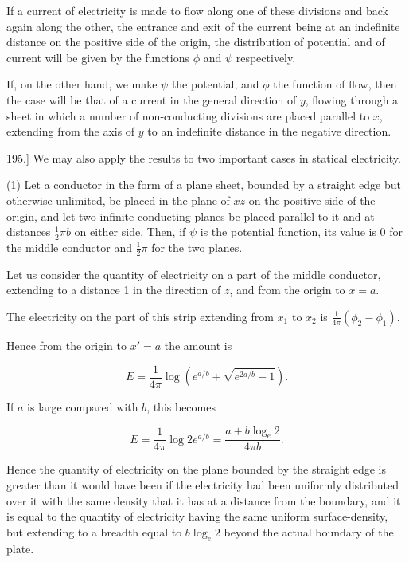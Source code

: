 \documentclass[11pt,a4paper]{article}
\begin{document}
If a current of electricity is made to flow along one of these divisions
and back again along the other, the entrance and exit of the current
being at an indefinite distance on the positive side of the origin, the
distribution of potential and of current will be given by the functions
$\phi$ and $\psi$ respectively.

If, on the other hand, we make $\psi$ the potential, and $\phi$ the
function of flow, then the case will be that of a current in the
general direction of $y$, flowing through a sheet in which a number of
non-conducting divisions are placed parallel to $x$, extending from the
axis of $y$ to an indefinite distance in the negative direction.

195.] We may also apply the results to two important cases in statical electricity.

(1) Let a conductor in the form of a plane sheet, bounded by a straight
edge but otherwise unlimited, be placed in the plane of $xz$ on the
positive side of the origin, and let two infinite conducting planes be
placed parallel to it and at distances $\frac{1}{2}\pi b$ on either
side. Then, if $\psi$ is the potential function, its value is 0 for
the middle conductor and $\frac{1}{2}\pi$ for the two planes.

Let us consider the quantity of electricity on a part of the middle
conductor, extending to a distance 1 in the direction of $z$, and from
the origin to $x=a$.

The electricity on the part of this strip extending from $x_1$ to
$x_2$ is $\frac{1}{4\pi}(\phi_2-\phi_1)$.

Hence from the origin to $x'=a$ the amount is

\begin{equation}\tag{11}
E=\frac{1}{4\pi}\log\left(e^{a/b}+\sqrt{e^{2a/b}-1}\right).
\end{equation}

If $a$ is large compared with $b$, this becomes

\begin{equation}\tag{12}
E=\frac{1}{4\pi}\log 2e^{a/b}
=\frac{a+b\log_e 2}{4\pi b}.
\end{equation}

Hence the quantity of electricity on the plane bounded by the straight
edge is greater than it would have been if the electricity had been
uniformly distributed over it with the same density that it has at a
distance from the boundary, and it is equal to the quantity of
electricity having the same uniform surface-density, but extending to a
breadth equal to $b\log_e 2$ beyond the actual boundary of the plate.
\end{document}
